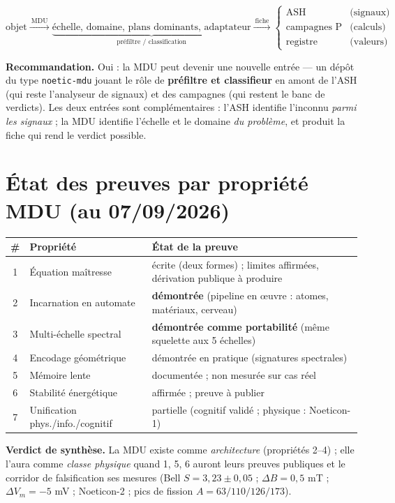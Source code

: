\documentclass[11pt,a4paper]{article}
\begin{document}
\begin{equation}
\text{objet} \xrightarrow{\ \mathrm{MDU}\ } \underbrace{\text{échelle, domaine, plans dominants, adaptateur}}_{\text{préfiltre / classification}}
\xrightarrow{\ \mathrm{fiche}\ }
\begin{cases}
\text{ASH} & \text{(signaux)}\\
\text{campagnes P} & \text{(calculs)}\\
\text{registre} & \text{(valeurs)}
\end{cases}
\end{equation}

\textbf{Recommandation.} Oui : la MDU peut devenir une nouvelle entrée --- un dépôt du type \texttt{noetic-mdu} jouant le rôle de \textbf{préfiltre et classifieur} en amont de l'ASH (qui reste l'analyseur de signaux) et des campagnes (qui restent le banc de verdicts). Les deux entrées sont complémentaires : l'ASH identifie l'inconnu \emph{parmi les signaux} ; la MDU identifie l'échelle et le domaine \emph{du problème}, et produit la fiche qui rend le verdict possible.

\appendix
\section{État des preuves par propriété MDU (au 07/09/2026)}

\begin{center}
\begin{tabular}{@{}cll@{}}
\toprule
\# & Propriété & État de la preuve \\
\midrule
1 & Équation maîtresse & écrite (deux formes) ; limites affirmées, dérivation publique à produire \\
2 & Incarnation en automate & \textbf{démontrée} (pipeline en œuvre : atomes, matériaux, cerveau) \\
3 & Multi-échelle spectral & \textbf{démontrée comme portabilité} (même squelette aux 5 échelles) \\
4 & Encodage géométrique & démontrée en pratique (signatures spectrales) \\
5 & Mémoire lente & documentée ; non mesurée sur cas réel \\
6 & Stabilité énergétique & affirmée ; preuve à publier \\
7 & Unification phys./info./cognitif & partielle (cognitif validé ; physique : Noeticon-1) \\
\bottomrule
\end{tabular}
\end{center}

\textbf{Verdict de synthèse.} La MDU existe comme \emph{architecture} (propriétés 2--4) ; elle l'aura comme \emph{classe physique} quand 1, 5, 6 auront leurs preuves publiques et le corridor de falsification ses mesures (Bell $S = 3{,}23 \pm 0{,}05$ ; $\Delta B = 0{,}5$ mT ; $\Delta V_m = -5$ mV ; Noeticon-2 ; pics de fission $A = 63/110/126/173$).
\end{document}
